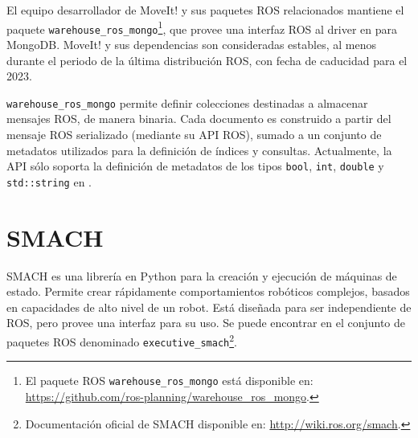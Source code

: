 El equipo desarrollador de MoveIt! y sus paquetes ROS relacionados mantiene el paquete \texttt{warehouse\_ros\_mongo}\footnote{El paquete ROS \texttt{warehouse\_ros\_mongo} está disponible en: \url{https://github.com/ros-planning/warehouse\_ros\_mongo}.}, que provee una interfaz ROS al driver en \CC para MongoDB. MoveIt! y sus dependencias son consideradas estables, al menos durante el periodo de la última distribución ROS, con fecha de caducidad para el 2023.

\texttt{warehouse\_ros\_mongo} permite definir colecciones destinadas a almacenar mensajes ROS, de manera binaria. Cada documento es construido a partir del mensaje ROS serializado (mediante su API ROS), sumado a un conjunto de metadatos utilizados para la definición de índices y consultas. Actualmente, la API sólo soporta la definición de metadatos de los tipos \texttt{bool}, \texttt{int}, \texttt{double} y \texttt{std::string} en \CC.


\section{SMACH}

SMACH es una librería en Python para la creación y ejecución de máquinas de estado. Permite crear rápidamente comportamientos robóticos complejos, basados en capacidades de alto nivel de un robot. Está diseñada para ser independiente de ROS, pero provee una interfaz para su uso. Se puede encontrar en el conjunto de paquetes ROS denominado \texttt{executive\_smach}\footnote{Documentación oficial de SMACH disponible en: \url{http://wiki.ros.org/smach}.}.



